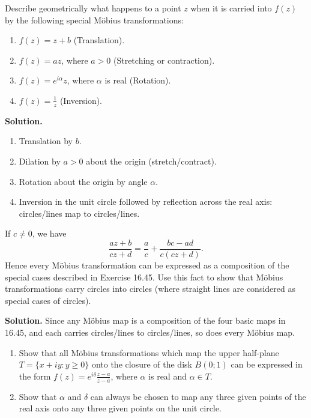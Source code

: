 \begin{problembox}
Describe geometrically what happens to a point \( z \) when it is carried into \( f(z) \) by the following special Möbius transformations:
\begin{enumerate}[label=(\alph*)]
\item \( f(z) = z + b \) (Translation).
\item \( f(z) = a z \), where \( a > 0 \) (Stretching or contraction).
\item \( f(z) = e^{i \alpha} z \), where \( \alpha \) is real (Rotation).
\item \( f(z) = \frac{1}{z} \) (Inversion).
\end{enumerate}
\end{problembox}

\noindent\textbf{Solution.}
\begin{enumerate}[label=(\alph*)]
\item Translation by $b$.
\item Dilation by $a>0$ about the origin (stretch/contract).
\item Rotation about the origin by angle $\alpha$.
\item Inversion in the unit circle followed by reflection across the real axis: circles/lines map to circles/lines.
\end{enumerate}

\begin{problembox}
If \( c \neq 0 \), we have
\[ \frac{a z + b}{c z + d} = \frac{a}{c} + \frac{b c - a d}{c (c z + d)}. \]
Hence every Möbius transformation can be expressed as a composition of the special cases described in Exercise 16.45. Use this fact to show that Möbius transformations carry circles into circles (where straight lines are considered as special cases of circles).
\end{problembox}

\noindent\textbf{Solution.}
Since any Möbius map is a composition of the four basic maps in 16.45, and each carries circles/lines to circles/lines, so does every Möbius map.

\begin{problembox}
\begin{enumerate}[label=(\alph*)]
\item Show that all Möbius transformations which map the upper half-plane \( T = \{ x + i y : y \geq 0 \} \) onto the closure of the disk \( B(0; 1) \) can be expressed in the form \( f(z) = e^{i \delta} \frac{z - a}{z - \bar{a}} \), where \( \alpha \) is real and \( \alpha \in T \).
\item Show that \( \alpha \) and \( \delta \) can always be chosen to map any three given points of the real axis onto any three given points on the unit circle.
\end{enumerate}
\end{problembox}

